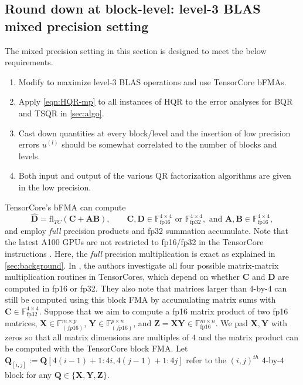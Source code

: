 \documentclass[review,onefignum,onetabnum]{siamart190516}
\newcommand{\F}{\mathbb{F}}
\newcommand{\bb}[1]{\mathbf{#1}}
\newcommand{\fl}{\mathrm{fl}}
\begin{document}
\subsection{Round down at block-level: level-3 BLAS mixed precision setting}\label{sec:mp-3}
The mixed precision setting in this section is designed to meet the below requirements.
\begin{enumerate}
	\item Modify  to maximize level-3 BLAS operations and use TensorCore bFMAs. 
	\item Apply \cref{eqn:HQR-mp} to all instances of HQR to the error analyses for BQR and TSQR in \cref{sec:algo}.
	\item Cast down quantities at every block/level and the insertion of low precision errors $u^{(l)}$ should be somewhat correlated to the number of blocks and levels. 
	\item Both input and output of the various QR factorization algorithms are given in the low precision. 
\end{enumerate}
TensorCore's bFMA can compute 
\begin{equation}
\hat{\bb{D}} =\fl_{TC}(\bb{C} + \bb{A}\bb{B}),\qquad \bb{C},\bb{D}\in\F_{\text{fp16}}^{4\times 4}\text{ or }\F_{\text{fp32}}^{4\times 4},\text{ and } \bb{A},\bb{B}\in\F_{\text{fp16}}^{4\times 4},\label{eqn:bFMA}
\end{equation}
and employ \emph{full} precision products and fp32 summation accumulate.
Note that the latest A100 GPUs are not restricted to fp16/fp32 in the TensorCore instructions \cite{nvdiaa100}.
Here, the \emph{full} precision multiplication is exact as explained in \cref{sec:background}.
In \cite{Blanchard2020}, the authors investigate all four possible matrix-matrix multiplication routines in TensorCores, which depend on whether $\bb{C}$ and $\bb{D}$ are computed in fp16 or fp32. 
They also note that matrices larger than $4$-by-$4$ can still be computed using this block FMA by accumulating matrix sums with $\bb{C}\in\F_{\text{fp32}}^{4\times 4}$.
Suppose that we aim to compute a fp16 matrix product of two fp16 matrices, $\bb{X}\in\F_{(fp16)}^{m\times p}$, $\bb{Y}\in\F_{(fp16)}^{p\times n}$, and $\bb{Z}=\bb{XY}\in\F_{\text{fp16}}^{m\times n}$.
We pad $\bb{X},\bb{Y}$ with zeros so that all matrix dimensions are multiples of $4$ and the matrix product can be computed with the TensorCore block FMA.
Let $\bb{Q}_{[i,j]}:= \bb{Q}[4(i-1)+1:4i,4(j-1)+1:4j]$ refer to the $(i,j)^{th}$ $4$-by-$4$ block for any $\bb{Q}\in\{\bb{X},\bb{Y},\bb{Z}\}$.
\end{document}
